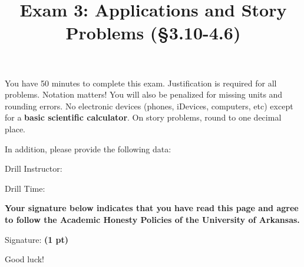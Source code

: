 \documentclass[12pt]{article}
\title{\vspace{-8pc}
\vfill{\Huge
	\bf Exam 3: Applications and Story Problems (\S 3.10-4.6)} 
	}
\author{}
\date{}
\begin{document}
\maketitle
\vspace{-3pc}
 You have 50 minutes to complete this exam.  Justification is required for all problems.  Notation matters!  You will also be penalized for missing units and rounding errors.  No electronic devices (phones, iDevices, computers, etc) except for a \textbf{basic scientific calculator}.  On story problems, round to one decimal place. %

\begin{flushright}
In addition, please provide the following data:

\vspace{1.5pc}
Drill Instructor: \underline{\hspace{40ex}}

\vspace{1.5pc}
Drill Time: \underline{\hspace{40ex}}
\end{flushright}

\vfill
\noindent\textbf{Your signature below indicates that you have read this page and agree to follow the Academic Honesty Policies of the University of Arkansas.}  

\vspace{2pc}
\noindent Signature: {\bf (1 pt)} \underline{\hspace{73ex}}

\begin{flushright}\Large Good luck!\end{flushright}
\end{document}
